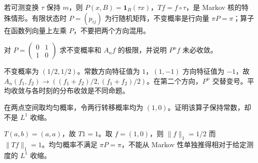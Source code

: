 \begin{example}[确定性过程与有限状态链]
若可测变换 $\tau$ 保持 $m$，则 $P(x,B)=\mathbf1_B(\tau x)$，$Tf=f\circ\tau$，是 Markov 核的特殊情形。有限状态时 $P=(p_{ij})$ 为行随机矩阵，不变概率是行向量 $\pi P=\pi$；算子在函数列向量上左乘 $P$，不要把两个方向混用。
\end{example}

\begin{exercise}[周期链]\label{ex:y13-periodic-chain}
对 $P=\left(\begin{smallmatrix}0&1\\1&0\end{smallmatrix}\right)$ 求不变概率和 $A_nf$ 的极限，并说明 $P^nf$ 未必收敛。
\end{exercise}
\begin{solution}
不变概率为 $(1/2,1/2)$。常数方向特征值为 $1$，$(1,-1)$ 方向特征值为 $-1$，故 $A_n(f_1,f_2)\to((f_1+f_2)/2,(f_1+f_2)/2)$。在第二个方向，$P^n$ 交替变号。平均收敛与各时刻的分布收敛是不同命题。
\end{solution}

\begin{exercise}[不变性不可省略]\label{ex:y13-noninvariant}
在两点空间取均匀概率，令两行转移概率均为 $(1,0)$。证明该算子保持常数，却不是 $L^1$ 收缩。
\end{exercise}
\begin{solution}
$T(a,b)=(a,a)$，故 $T1=1$。取 $f=(1,0)$，则 $\|f\|_1=1/2$ 而 $\|Tf\|_1=1$。均匀概率不满足 $\pi P=\pi$，不能从 Markov 性单独推得相对于给定测度的 $L^1$ 收缩。
\end{solution}
